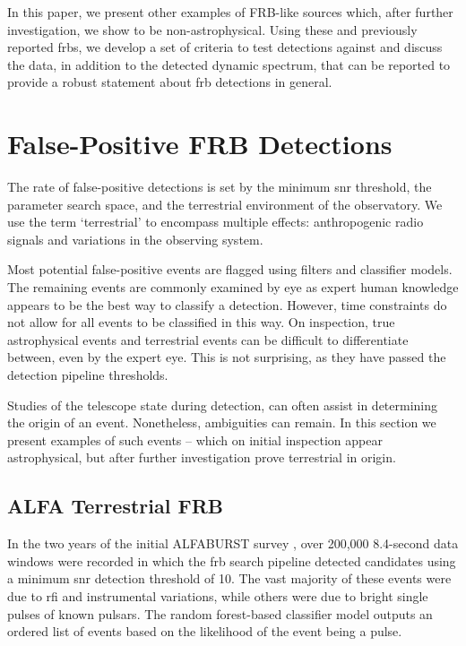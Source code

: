 \documentclass[a4paper,fleqn,usenatbib]{mnras}
\begin{document}
In this paper, we present other examples of FRB-like sources which, after
further investigation, we show to be non-astrophysical. Using these and
previously reported \glspl{frb}, we develop a set of criteria to test detections
against and discuss the data, in addition to the detected dynamic spectrum, that
can be reported to provide a robust statement about \gls{frb} detections in
general.

\section{False-Positive FRB Detections}
\label{sec:false-pos}

The rate of false-positive detections is set by the minimum \gls{snr} threshold,
the parameter search space, and the terrestrial environment of the observatory.
We use the term `terrestrial' to encompass multiple effects: anthropogenic radio
signals and variations in the observing system.

Most potential false-positive events are flagged using filters and classifier
models.  The remaining events are commonly examined by eye as expert human
knowledge appears to be the best way to classify a detection. However, time
constraints do not allow for all events to be classified in this way. On
inspection, true astrophysical events and terrestrial events can be difficult to
differentiate between, even by the expert eye.  This is not surprising, as they
have passed the detection pipeline thresholds.

Studies of the telescope state during detection, can often assist in determining
the origin of an event. Nonetheless, ambiguities can remain.  In this section we
present examples of such events -- which on initial inspection appear
astrophysical, but after further investigation prove terrestrial in origin.

\subsection{ALFA Terrestrial FRB}
\label{sec:D20161204}

In the two years of the initial ALFABURST survey \citep{2017ApJS..228...21C,
2018MNRAS.474.3847F}, over 200,000 8.4-second data windows were recorded in which
the \gls{frb} search pipeline detected candidates using a minimum \gls{snr}
detection threshold of 10. The vast majority of these events were due to
\gls{rfi} and instrumental variations, while others were due to bright single
pulses of known pulsars.  The random forest-based classifier model outputs an
ordered list of events based on the likelihood of the event being a pulse.
\end{document}
